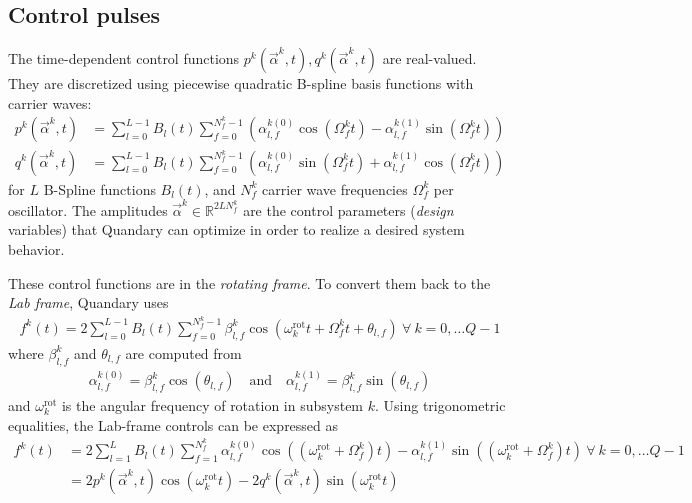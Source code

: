 \documentclass[11pt]{article}
\newcommand{\R}{\mathds{R}}
\begin{document}
\subsection{Control pulses} \label{subsec:controlpulses}
The time-dependent control functions $p^k(\vec{\alpha}^k,t),
q^k(\vec{\alpha}^k,t)$ are real-valued. They are discretized using piecewise quadratic B-spline basis functions with
carrier waves: 
\begin{align}
  p^k(\vec{\alpha}^k,t) &= \sum_{l=0}^{L-1} B_l(t)
  \sum_{f=0}^{N_f^k-1} \left(\alpha^{k
  (0)}_{l,f} \cos(\Omega_f^k t) - \alpha^{k (1)}_{l,f} \sin(\Omega_f^k t)
  \right) \\
  q^k(\vec{\alpha}^k,t) &= \sum_{l=0}^{L-1} B_l(t)
  \sum_{f=0}^{N_f^k-1} \left( \alpha^{k
  (0)}_{l,f} \sin(\Omega_f^k t) + \alpha^{k (1)}_{l,f} \cos(\Omega_f^k t)
  \right)
\end{align}
for $L$ B-Spline functions $B_l(t)$, and $N_f^k$ carrier wave frequencies
$\Omega_f^k$ per oscillator. The amplitudes $\vec{\alpha}^k \in \R^{2LN_f^k}$ are the control
parameters (\textit{design} variables) that Quandary can optimize in order to realize a
desired system behavior. 

These control functions are in the \textit{rotating frame}. To convert them back
to the \textit{Lab frame}, Quandary uses
\begin{align}
  f^k(t) = 2 \sum_{l=0}^{L-1} B_l(t) \sum_{f=0}^{N_f^k-1} \beta_{l,f}^k \cos(\omega_k^{\text{rot}} t +
  \Omega_f^k t + \theta_{l,f}) \ \forall\  k=0,\dots Q-1
\end{align}
where $\beta_{l,f}^k$ and $\theta_{l,f}$ are computed from
\begin{align}
  \alpha_{l,f}^{k(0)} = \beta_{l,f}^k \cos(\theta_{l,f}) \quad \text{and} \quad
  \alpha_{l,f}^{k(1)} = \beta_{l,f}^k \sin(\theta_{l,f})
\end{align}
and $\omega_k^{\text{rot}}$ is the angular frequency of rotation in subsystem $k$. Using
trigonometric equalities, the Lab-frame controls can be expressed as
\begin{align}
  f^k(t) &= 2 \sum_{l=1}^L B_l(t) \sum_{f=1}^{N_f^k} \alpha_{l,f}^{k(0)} \cos((\omega_k^{\text{rot}}
  + \Omega_f^k) t) - \alpha_{l,f}^{k(1)}\sin((\omega_k^{\text{rot}} + \Omega_f^k) t) \ \forall\ %
  k=0,\dots Q-1 \\
         &= 2 p^k(\vec{\alpha}^k, t) \cos(\omega_k^{\text{rot}} t) - 2 q^k(\vec{\alpha}^k,
         t)\sin(\omega_k^{\text{rot}} t) \\
\end{align}
\end{document}
